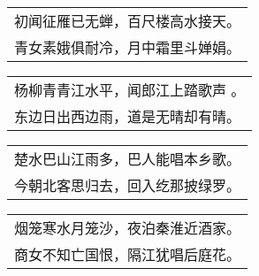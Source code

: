 \noindent\begin{minipage}{\linewidth}
  \vskip-3pt\begin{table}[H]
    \centering
    \begin{tabular}{@{}l@{}}
初闻征雁已无蝉，百尺楼高水接天。\\
青女素娥俱耐冷，月中霜里斗婵娟。
    \end{tabular}
  \end{table}
\end{minipage}
\vspace{1cm}


\noindent\begin{minipage}{\linewidth}
  \vskip-3pt\begin{table}[H]
    \centering
    \begin{tabular}{@{}l@{}}
杨柳青青江水平，闻郎江上踏歌声 。\\
东边日出西边雨，道是无晴却有晴。
    \end{tabular}
  \end{table}
\end{minipage}
\vspace{1cm}


\noindent\begin{minipage}{\linewidth}
  \vskip-3pt\begin{table}[H]
    \centering
    \begin{tabular}{@{}l@{}}
楚水巴山江雨多，巴人能唱本乡歌。\\
今朝北客思归去，回入纥那披绿罗。
    \end{tabular}
  \end{table}
\end{minipage}
\vspace{1cm}


\noindent\begin{minipage}{\linewidth}
  \vskip-3pt\begin{table}[H]
    \centering
    \begin{tabular}{@{}l@{}}
烟笼寒水月笼沙，夜泊秦淮近酒家。\\
商女不知亡国恨，隔江犹唱后庭花。
    \end{tabular}
  \end{table}
\end{minipage}
\vspace{1cm}



